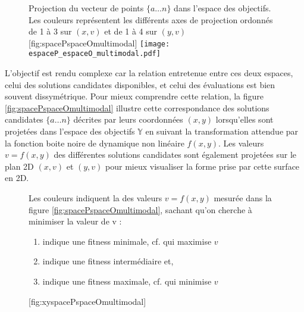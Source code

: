 \begin{figure}[ht]
	\begin{sidecaption}[fortoc]{Projection du vecteur de points $\{a \dotsc n\}$ dans l'espace des objectifs. Les couleurs représentent les différents axes de projection ordonnés de 1 à 3 sur $(x,v)$ et de 1 à 4 sur $(y,v)$}[fig:spacePspaceOmultimodal]
	 \centering
	 	\texttt{[image: espaceP\_espaceO\_multimodal.pdf]}
	\end{sidecaption}
\end{figure}

L'objectif est rendu complexe car la relation entretenue entre ces deux espaces, celui des solutions candidates disponibles, et celui des évaluations est bien souvent dissymétrique. Pour mieux comprendre cette relation, la figure \ref{fig:spacePspaceOmultimodal} illustre cette correspondance des solutions candidates $\{a \dotsc n\}$ décrites par leurs coordonnées $(x,y)$ lorsqu'elles sont projetées dans l'espace des objectifs $\mathbb{Y}$ en suivant la transformation attendue par la fonction boite noire de dynamique non linéaire $f(x,y)$. Les valeurs $v = f(x,y)$ des différentes solutions candidates sont également projetées sur le plan 2D $(x,v)$ et $(y,v)$ pour mieux visualiser la forme prise par cette surface en 2D.

\begin{figure}[!htbp]
	\begin{sidecaption}[fortoc]{Les couleurs indiquent la  des valeurs $v = f(x,y)$ mesurée dans la figure \ref{fig:spacePspaceOmultimodal}, sachant qu'on cherche à minimiser la valeur de v :
\parbox{\marginparwidth}{
\begin{enumerate}[label={},labelindent=0pt,leftmargin=*]
        \item {} indique une fitness minimale, cf. qui maximise $v$
        \item {} indique une fitness intermédiaire et,
        \item {} indique une fitness maximale, cf. qui minimise $v$
\end{enumerate}}}[fig:xyspacePspaceOmultimodal]
	 \centering
	\end{sidecaption}
\end{figure}

